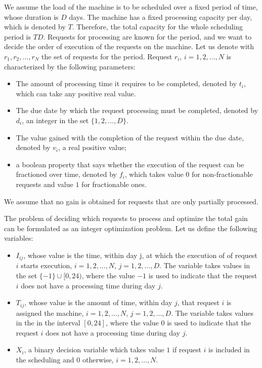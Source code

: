 \documentclass{IEEEtran}
\begin{document}
We assume the load of the machine is to be scheduled over a fixed period of time, whose duration is $D$ days. The machine has a fixed processing capacity per day, which is denoted by $T$. Therefore, the total capacity for the whole scheduling period is $TD$. 
Requests for processing are known for the period, and we want to decide the order of execution of the requests on the machine. 
Let us denote with $r_1,r_2,\ldots,r_N$ the set of requests for the period. 
Request $r_i$, $i=1,2,\ldots,N$ is characterized by the following  parameters:
\begin{itemize}
\item The amount of processing time it requires to be completed, denoted by $t_i$, which can take any positive real value.
\item The due date by which the request processing must be completed, denoted by $d_i$, an integer in the set $\{1,2,\ldots,D\}$.
\item The value gained with the completion of the request within the due date, denoted by $v_i$, a real positive value;
\item a boolean property that says whether the execution of the request can be fractioned over time, denoted by $f_i$, which takes value $0$ for non-fractionable requests and value $1$ for fractionable ones. 
\end{itemize}
We assume that no gain is obtained for requests that are only partially processed. 

The problem of deciding which requests to process and optimize the total gain can be  formulated as an integer optimization problem.
Let us define the following variables: 
\begin{itemize}
\item 
$I_{ij}$, whose value is the time, within day j, at which the execution of of request $i$ starts execution, $i=1,2,\ldots,N$, $j=1,2,\ldots,D$. The variable takes values in the set $\{-1\} \cup [0,24)$, where the value $-1$ is used to indicate that the request $i$ does not have a processing time during day $j$. 
\item
$T_{ij}$,  whose value is the amount of time, within day $j$, that request $i$ is assigned the machine, $i=1,2,\ldots,N$, $j=1,2,\ldots,D$. The variable takes values in the in the interval $[0,24]$, where the value $0$ is used to indicate that the request $i$ does not have a processing time during day $j$. 
\item 
$X_i$, a binary decision variable which takes value $1$ if request $i$ is included in the scheduling and $0$ otherwise, $i=1,2,\ldots,N$. 
\end{itemize}
\end{document}
